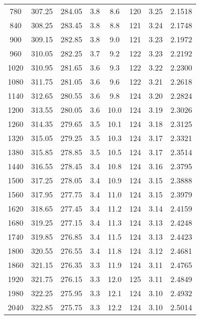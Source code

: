 \begin{table}[H]
\begin{tabular}{c c c c c c c c}
    780   &	 307.25  &	284.05	&	 3.8	&  8.6 	 &  120  & 	3.25	&   2.1518  \\
    840   &	 308.25  & 	283.45	&	 3.8	&  8.8 	 &  121  &	3.24	&   2.1748  \\
    900   &	 309.15  &	282.85	&	 3.8	&  9.0 	 &  121  &  3.23	&   2.1972  \\
    960   &	 310.05  &  282.25	&	 3.7	&  9.2 	 &  122  &  3.23	&   2.2192 \\
    1020  &	 310.95  &  281.65	&	 3.6	&  9.3 	 &  122  &  3.22	&   2.2300 \\
    1080  &	 311.75  &  281.05	&	 3.6	&  9.6 	 &  122	 &  3.21	&   2.2618 \\
    1140  &	 312.65  &  280.55	&	 3.6	&  9.8 	 &  124  &  3.20	&   2.2824 \\
    1200  &	 313.55  &  280.05	&	 3.6	&  10.0  &	124  &  3.19	&   2.3026  \\
    1260  &	 314.35  &  279.65	&	 3.5	&  10.1  &	124  &  3.18	&   2.3125  \\
    1320	&  315.05  &  279.25	&	 3.5	&  10.3  &  124  &  3.17	&   2.3321  \\
    1380	&  315.85  &  278.85	&	 3.5	&  10.5  &	124  &  3.17	&   2.3514 \\
    1440	&  316.55  &	278.45	&	 3.4	&  10.8  &	124	 &  3.16	&   2.3795  \\
    1500	&  317.25  & 	278.05	&	 3.4	&  10.9  &	124	 &  3.15	&   2.3888 \\
    1560	&  317.95  &	277.75	&	 3.4	&  11.0  &	124  &  3.15	&   2.3979  \\
    1620	&  318.65  & 	277.45	&	 3.4	&  11.2  &	124  &  3.14	&   2.4159 \\
    1680	&  319.25  & 	277.15	&	 3.4	&  11.3  &	124  &  3.13	&   2.4248 \\
    1740	&  319.85  & 	276.85	&  3.4	&  11.5  &	124  &  3.13	&   2.4423 \\
    1800	&  320.55  & 	276.55	&  3.4	&  11.8  &	124  &  3.12	&   2.4681 \\
    1860	&  321.15  &	276.35	&  3.3	&  11.9  &	124  &  3.11	&   2.4765  \\
    1920	&  321.75  &	276.15  &	 3.3	&  12.0  &  125  &  3.11	&   2.4849  \\
    1980	&  322.25  &  275.95  &	 3.3	&  12.1  &  124  &  3.10	&   2.4932 \\
    2040	&  322.85  &  275.75  &	 3.3	&  12.2  &  124  &  3.10	&   2.5014 \\

    \bottomrule
  \end{tabular}
\end{table}

